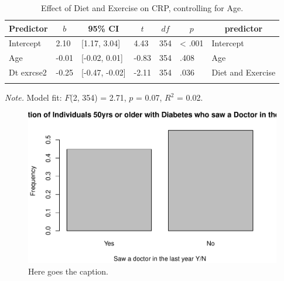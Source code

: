 \documentclass[
  man]{apa6}
\begin{document}
\begin{table}[tbp]

\begin{center}
\begin{threeparttable}

\caption{\label{tab:RQ2}Effect of Diet and Exercise on CRP, controlling for Age.}

\begin{tabular}{lllllll}
\toprule
Predictor & \multicolumn{1}{c}{$b$} & \multicolumn{1}{c}{95\% CI} & \multicolumn{1}{c}{$t$} & \multicolumn{1}{c}{$\mathit{df}$} & \multicolumn{1}{c}{$p$} & \multicolumn{1}{c}{predictor}\\
\midrule
Intercept & 2.10 & {}[1.17, 3.04] & 4.43 & 354 & < .001 & Intercept\\
Age & -0.01 & {}[-0.02, 0.01] & -0.83 & 354 & .408 & Age\\
Dt exrcse2 & -0.25 & {}[-0.47, -0.02] & -2.11 & 354 & .036 & Diet and Exercise\\
\bottomrule
\addlinespace
\end{tabular}

\begin{tablenotes}[para]
\normalsize{\textit{Note.} Model fit: $F$(2, 354) = 2.71, $p$ = 0.07, $R^2$ = 0.02.}
\end{tablenotes}

\end{threeparttable}
\end{center}

\end{table}

\begin{figure}
\centering
\includegraphics{NEW_Final_Groupof5_files/figure-latex/RQ3-brittany-1.pdf}
\caption{\label{fig:RQ3-brittany}Here goes the caption.}
\end{figure}
\end{document}
